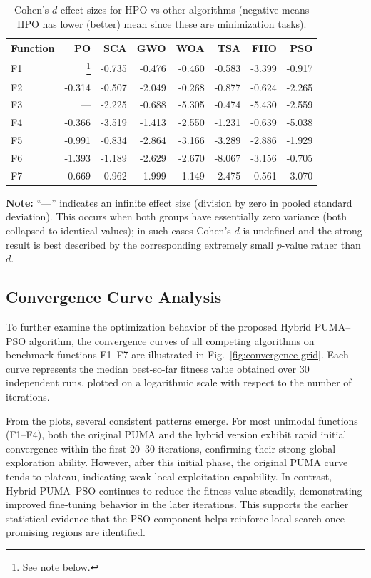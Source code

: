 \documentclass[a4paper,12pt]{article}
\begin{document}
\begin{table}[htbp]
\centering
\caption{Cohen's $d$ effect sizes for HPO vs other algorithms (negative means HPO has lower (better) mean since these are minimization tasks).}
\label{tab:cohens_d}
\begin{tabular}{lrrrrrrr}
\toprule
Function & PO & SCA & GWO & WOA & TSA & FHO & PSO \\
\midrule
F1 & ---\footnote{See note below.} & -0.735 & -0.476 & -0.460 & -0.583 & -3.399 & -0.917 \\
F2 & -0.314 & -0.507 & -2.049 & -0.268 & -0.877 & -0.624 & -2.265 \\
F3 & ---\footnotemark[1] & -2.225 & -0.688 & -5.305 & -0.474 & -5.430 & -2.559 \\
F4 & -0.366 & -3.519 & -1.413 & -2.550 & -1.231 & -0.639 & -5.038 \\
F5 & -0.991 & -0.834 & -2.864 & -3.166 & -3.289 & -2.886 & -1.929 \\
F6 & -1.393 & -1.189 & -2.629 & -2.670 & -8.067 & -3.156 & -0.705 \\
F7 & -0.669 & -0.962 & -1.999 & -1.149 & -2.475 & -0.561 & -3.070 \\
\bottomrule
\end{tabular}

\bigskip
\textbf{Note:} ``---'' indicates an infinite effect size (division by zero in pooled standard deviation). This occurs when both groups have essentially zero variance (both collapsed to identical values); in such cases Cohen's $d$ is undefined and the strong result is best described by the corresponding extremely small $p$-value rather than $d$.
\end{table}
\FloatBarrier

\subsection{Convergence Curve Analysis}
\label{sec:convergence-analysis}

To further examine the optimization behavior of the proposed Hybrid PUMA–PSO algorithm, 
the convergence curves of all competing algorithms on benchmark functions F1–F7 are 
illustrated in Fig.~\ref{fig:convergence-grid}. Each curve represents the median 
best-so-far fitness value obtained over 30 independent runs, plotted on a logarithmic 
scale with respect to the number of iterations.

From the plots, several consistent patterns emerge. For most unimodal functions 
(F1–F4), both the original PUMA and the hybrid version exhibit rapid initial convergence 
within the first 20–30 iterations, confirming their strong global exploration ability. 
However, after this initial phase, the original PUMA curve tends to plateau, 
indicating weak local exploitation capability. In contrast, Hybrid PUMA–PSO continues 
to reduce the fitness value steadily, demonstrating improved fine-tuning behavior in the 
later iterations. This supports the earlier statistical evidence that the PSO component 
helps reinforce local search once promising regions are identified.
\end{document}
